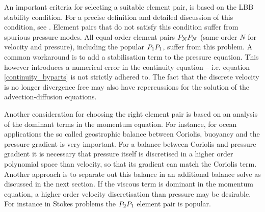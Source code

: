 An important criteria for selecting a suitable element pair,
is based on the LBB stability condition. For a precise definition and
detailed discussion of this condition, see \cite{gresho1988}. Element pairs
that do not satisfy this condition suffer from spurious pressure modes. All equal order element pairs
$P_NP_N$ (same order $N$ for velocity and pressure), including the popular $P_1P_1$, suffer from this problem.
A common workaround is to add
a stabilisation term to the pressure equation. This however introduces a numerical error in
the continuity equation -- i.e. equation \eqref{continuity_byparts} is not strictly adhered to.
The fact that the discrete velocity is no longer divergence free may
also have repercussions for the solution of the advection-diffusion equations.

Another consideration for choosing the right element pair is based
on an analysis of the
dominant terms in the momentum equation. For instance, for ocean applications the
so called geostrophic balance between Coriolis, buoyancy and the pressure gradient
is very important. For a balance between Coriolis and pressure gradient it is necessary
that pressure itself is discretised in a higher order polynomial space than velocity, so that its
gradient can match the Coriolis term. Another approach is to separate out this balance in an
additional balance solve as discussed in the next section. If the viscous term is dominant in
the momentum equation, a higher order velocity discretisation than pressure may be
desirable. For instance in Stokes problems the $P_2P_1$ element pair is popular.

